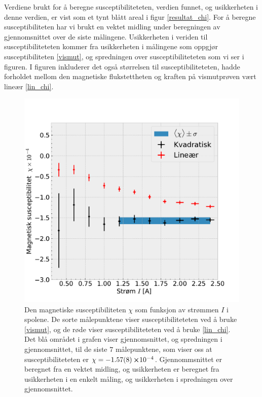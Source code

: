 \documentclass[%
 reprint,
 amsmath,amssymb,
 aps,
 norsk,
]{revtex4-1}
\begin{document}
Verdiene brukt for å beregne susceptibiliteteten, verdien funnet, og usikkerheten i denne verdien, er vist som et tynt blått areal i figur \vref{resultat_chi}. For å beregne susceptibiliteten har vi brukt en vektet midling under beregningen av gjennomsnittet over de siste målingene. Usikkerheten i veriden til susceptibiliteteten kommer fra usikkerheten i målingene som oppgjør susceptibiliteten \eqref{vismut}, og spredningen over susceptibiliteteten som vi ser i figuren. I figuren inkluderer det også størrelsen til susceptibiliteteten, hadde forholdet mellom den magnetiske flukstettheten og kraften på vismutprøven vært lineær \eqref{lin_chi}.
\begin{figure}[h!]
  \centering
  \includegraphics[scale=0.45]{chi_effekt.pdf}
  \caption{Den magnetiske susceptibiliteten $\chi$ som funksjon av strømmen $I$ i spolene. De sorte målepunktene viser susceptibiliteteten ved å bruke \eqref{vismut}, og de røde viser susceptibiliteteten ved å bruke \eqref{lin_chi}. Det blå området i grafen viser gjennomsnittet, og spredningen i gjennomsnittet, til de siste $7$ målepunktene, som viser oss at susceptibiliteteten er $\chi = -\SI{1.57\pm0.08}\cross 10^{-4}$. Gjennommsnittet er beregnet fra en vektet midling, og usikkerheten er beregnet fra usikkerheten i en enkelt måling, og usikkerheten i spredningen over gjennomsnittet.}
  \label{resultat_chi}
\end{figure}
\end{document}
